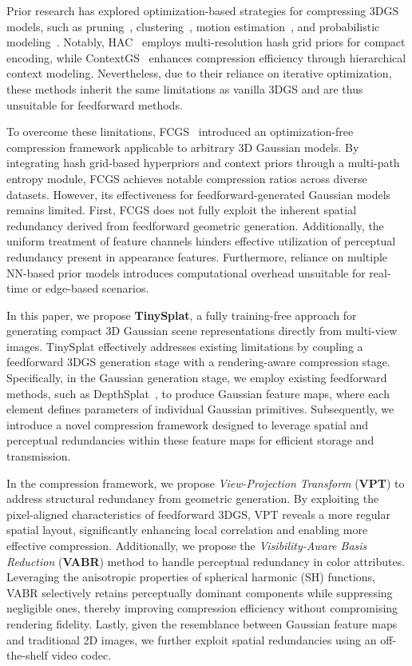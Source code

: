 \documentclass[lettersize,journal]{IEEEtran}
\begin{document}
Prior research has explored optimization-based strategies for compressing 3DGS models, such as pruning~\cite{papantonakis2024reducing, lee2024compactrad, shi2024lapisgs, wang2024end2end, fan2024lightgaussian}, clustering~\cite{lu2024scaffold}, motion estimation~\cite{gao2024hicom, tang2025compressing}, and probabilistic modeling~\cite{chen2024hac, wang2024contextgs}. Notably, HAC~\cite{chen2024hac} employs multi-resolution hash grid priors for compact encoding, while ContextGS~\cite{wang2024contextgs} enhances compression efficiency through hierarchical context modeling. Nevertheless, due to their reliance on iterative optimization, these methods inherit the same limitations as vanilla 3DGS and are thus unsuitable for feedforward methods.

To overcome these limitations, FCGS~\cite{chen2024fcgc} introduced an optimization-free compression framework applicable to arbitrary 3D Gaussian models. By integrating hash grid-based hyperpriors and context priors through a multi-path entropy module, FCGS achieves notable compression ratios across diverse datasets. However, its effectiveness for feedforward-generated Gaussian models remains limited. First, FCGS does not fully exploit the inherent spatial redundancy derived from feedforward geometric generation. Additionally, the uniform treatment of feature channels hinders effective utilization of perceptual redundancy present in appearance features. Furthermore, reliance on multiple NN-based prior models introduces computational overhead unsuitable for real-time or edge-based scenarios.

In this paper, we propose \textbf{TinySplat}, a fully training-free approach for generating compact 3D Gaussian scene representations directly from multi-view images. TinySplat effectively addresses existing limitations by coupling a feedforward 3DGS generation stage with a rendering-aware compression stage. Specifically, in the Gaussian generation stage, we employ existing feedforward methods, such as DepthSplat~\cite{xu2024depthsplat}, to produce Gaussian feature maps, where each element defines parameters of individual Gaussian primitives. Subsequently, we introduce a novel compression framework designed to leverage spatial and perceptual redundancies within these feature maps for efficient storage and transmission.

In the compression framework, we propose \textit{View-Projection Transform} (\textbf{VPT}) to address structural redundancy from geometric generation. By exploiting the pixel-aligned characteristics of feedforward 3DGS, VPT reveals a more regular spatial layout, significantly enhancing local correlation and enabling more effective compression. Additionally, we propose the \textit{Visibility-Aware Basis Reduction} (\textbf{VABR}) method to handle perceptual redundancy in color attributes. Leveraging the anisotropic properties of spherical harmonic (SH) functions, VABR selectively retains perceptually dominant components while suppressing negligible ones, thereby improving compression efficiency without compromising rendering fidelity. Lastly, given the resemblance between Gaussian feature maps and traditional 2D images, we further exploit spatial redundancies using an off-the-shelf video codec.
\end{document}
